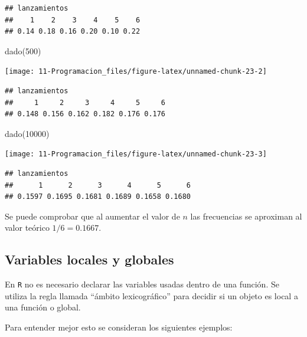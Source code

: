 \documentclass[
]{book}
\newenvironment{Shaded}{\begin{snugshade}}{\end{snugshade}}
\newcommand{\DecValTok}[1]{\textcolor[rgb]{0.00,0.00,0.81}{#1}}
\newcommand{\FunctionTok}[1]{\textcolor[rgb]{0.00,0.00,0.00}{#1}}
\newcommand{\NormalTok}[1]{#1}
\theoremstyle{break}
\theoremstyle{nonumberplain}
\begin{document}
\begin{verbatim}
## lanzamientos
##    1    2    3    4    5    6 
## 0.14 0.18 0.16 0.20 0.10 0.22
\end{verbatim}

\begin{Shaded}
\begin{Highlighting}[]
\FunctionTok{dado}\NormalTok{(}\DecValTok{500}\NormalTok{)}
\end{Highlighting}
\end{Shaded}

\begin{center}\texttt{[image: 11-Programacion\_files/figure-latex/unnamed-chunk-23-2]} \end{center}

\begin{verbatim}
## lanzamientos
##     1     2     3     4     5     6 
## 0.148 0.156 0.162 0.182 0.176 0.176
\end{verbatim}

\begin{Shaded}
\begin{Highlighting}[]
\FunctionTok{dado}\NormalTok{(}\DecValTok{10000}\NormalTok{)}
\end{Highlighting}
\end{Shaded}

\begin{center}\texttt{[image: 11-Programacion\_files/figure-latex/unnamed-chunk-23-3]} \end{center}

\begin{verbatim}
## lanzamientos
##      1      2      3      4      5      6 
## 0.1597 0.1695 0.1681 0.1689 0.1658 0.1680
\end{verbatim}

Se puede comprobar que al aumentar el valor de \(n\) las frecuencias se
aproximan al valor teórico \(1/6=0.1667\).

\hypertarget{variables-locales-y-globales}{%
\subsection{Variables locales y globales}\label{variables-locales-y-globales}}

En \texttt{R} no es
necesario declarar las variables usadas dentro de una función. Se
utiliza la regla llamada ``ámbito lexicográfico'' para decidir si un
objeto es local a una función o global.

Para entender mejor esto se consideran los siguientes ejemplos:
\end{document}
